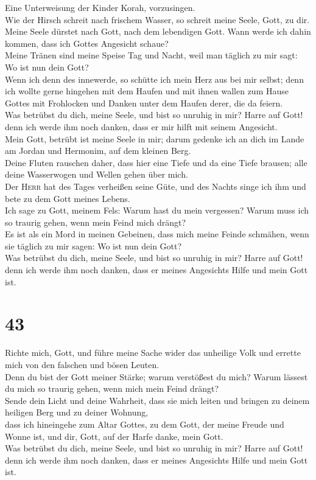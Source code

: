  Eine Unterweisung der Kinder Korah, vorzusingen.\\
 Wie der Hirsch schreit nach frischem Wasser, so schreit
meine Seele, Gott, zu dir.\\
 Meine Seele dürstet nach Gott, nach dem lebendigen Gott.
Wann werde ich dahin kommen, dass ich Gottes Angesicht schaue?\\
 Meine Tränen sind meine Speise Tag und Nacht, weil man
täglich zu mir sagt: Wo ist nun dein Gott?\\
 Wenn ich denn des innewerde, so schütte ich mein Herz aus
bei mir selbst; denn ich wollte gerne hingehen mit dem Haufen und mit
ihnen wallen zum Hause Gottes mit Frohlocken und Danken unter dem Haufen
derer, die da feiern.\\
 Was betrübst du dich, meine Seele, und bist so unruhig in
mir? Harre auf Gott! denn ich werde ihm noch danken, dass er mir hilft
mit seinem Angesicht.\\
 Mein Gott, betrübt ist meine Seele in mir; darum gedenke
ich an dich im Lande am Jordan und Hermonim, auf dem kleinen Berg.\\
 Deine Fluten rauschen daher, dass hier eine Tiefe und da
eine Tiefe brausen; alle deine Wasserwogen und Wellen gehen über mich.\\
 Der \textsc{Herr} hat des Tages verheißen seine Güte, und
des Nachts singe ich ihm und bete zu dem Gott meines Lebens.\\
 Ich sage zu Gott, meinem Fels: Warum hast du mein
vergessen? Warum muss ich so traurig gehen, wenn mein Feind mich
drängt?\\
 Es ist als ein Mord in meinen Gebeinen, dass mich meine
Feinde schmähen, wenn sie täglich zu mir sagen: Wo ist nun dein Gott?\\
 Was betrübst du dich, meine Seele, und bist so unruhig
in mir? Harre auf Gott! denn ich werde ihm noch danken, dass er meines
Angesichts Hilfe und mein Gott ist.

\hypertarget{section-42}{%
\section{43}\label{section-42}}

 Richte mich, Gott, und führe meine Sache wider das
unheilige Volk und errette mich von den falschen und bösen Leuten.\\
 Denn du bist der Gott meiner Stärke; warum verstößest du
mich? Warum lässest du mich so traurig gehen, wenn mich mein Feind
drängt?\\
 Sende dein Licht und deine Wahrheit, dass sie mich leiten
und bringen zu deinem heiligen Berg und zu deiner Wohnung,\\
 dass ich hineingehe zum Altar Gottes, zu dem Gott, der
meine Freude und Wonne ist, und dir, Gott, auf der Harfe danke, mein
Gott.\\
 Was betrübst du dich, meine Seele, und bist so unruhig in
mir? Harre auf Gott! denn ich werde ihm noch danken, dass er meines
Angesichts Hilfe und mein Gott ist.

